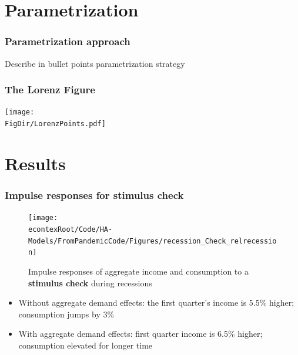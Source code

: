 \documentclass[pdflatex]{beamer}
\begin{document}
\section{Parametrization}


\begin{frame}
\frametitle{Parametrization approach}
Describe in bullet points parametrization strategy
\end{frame}


\begin{frame}
\frametitle{The Lorenz Figure}
\centerline{\texttt{[image: \\FigDir/LorenzPoints.pdf]}}
\end{frame}


\section{Results}


\begin{frame}
\frametitle{Impulse responses for stimulus check}

	\begin{figure}
		\centering
		\texttt{[image: \\econtexRoot/Code/HA-Models/FromPandemicCode/Figures/recession\_Check\_relrecession]}
		\caption{Impulse responses of aggregate income and consumption to a \textbf{stimulus check} during recessions}
	\end{figure}


	\begin{itemize}
		\item Without aggregate demand effects: the first quarter's income is 5.5\% higher; consumption jumps by 3\% 
		\item With aggregate demand effects: first quarter income is 6.5\% higher; consumption elevated for longer time
	\end{itemize}

\end{frame}
\end{document}

